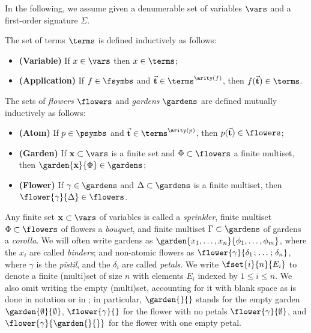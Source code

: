 \begin{scope}
In the following, we assume given a denumerable set of variables $\vars$
and a first-order signature $\Sigma$.

\begin{definition}[Terms]
  The set of terms $\terms$ is defined inductively as follows:
  \begin{itemize}
    \item{\textbf{(Variable)}} If $x \in \vars$ then $x \in \terms$;
    \item{\textbf{(Application)}} If $f \in \fsymbs$ and $\tvec{t}
    \in \terms^{\arity(f)}$, then $f(\tvec{t}) \in \terms$.
  \end{itemize}
\end{definition}

\begin{definition}[Flowers]
  The sets of \emph{flowers} $\flowers$ and \emph{gardens} $\gardens$ are
  defined mutually inductively as follows:
  \begin{itemize}
    \item{\textbf{(Atom)}} If $p \in \psymbs$ and $\tvec{t} \in
    \terms^{\arity(p)}$, then $p(\tvec{t}) \in \flowers$;
    \item{\textbf{(Garden)}} If $\bx \subset \vars$ is a finite set and $\Phi
    \subset \flowers$ a finite multiset, then $\garden{\bx}{\Phi} \in
    \gardens$;
    \item{\textbf{(Flower)}} If $\gamma \in \gardens$ and $\Delta \subset \gardens$
    is a finite multiset, then $\flower{\gamma}{\Delta} \in \flowers$.
  \end{itemize}
\end{definition}

Any finite set $\bx \subset \vars$ of variables is called a \emph{sprinkler},
finite multiset $\Phi \subset \flowers$ of flowers a \emph{bouquet}, and finite
multiset $\Gamma \subset \gardens$ of gardens a \emph{corolla}. We will often
write gardens as $\garden{x_1, \ldots, x_n}{\phi_1, \ldots, \phi_m}$, where the
$x_i$ are called \emph{binders}; and non-atomic flowers as
$\flower{\gamma}{\delta_1 \sep \ldots \sep \delta_n}$, where $\gamma$ is the
\emph{pistil}, and the $\delta_i$ are called \emph{petals}. We write
$\fset{i}{n}{E_i}$ to denote a finite (multi)set of size $n$ with elements $E_i$
indexed by $1 \leq i \leq n$. We also omit writing the empty (multi)set,
accounting for it with blank space as is done in  notation or in ; in
particular, $\garden{{}}{{}}$ stands for the empty garden
$\garden{\emptyset}{\emptyset}$, $\flower{\gamma}{{}}$ for the flower with no
petals $\flower{\gamma}{\emptyset}$, and $\flower{\gamma}{\garden{{}}{{}}}$ for
the flower with one empty petal.


\end{scope}
